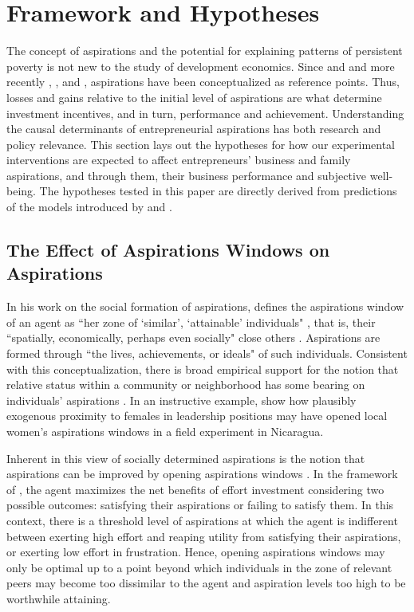 \documentclass[11.5pt]{article}
\begin{document}
\section{Framework and Hypotheses} \label{sec:theory}

The concept of aspirations and the potential for explaining patterns of persistent poverty is not new to the study of development economics. Since \citet{Simon1955} and \citet{Selten1998} and more recently \citet{Bogliacino2014}, \citet{Dalton2016}, and \citet{Genicot2017}, aspirations have been conceptualized as reference points. Thus, losses and gains relative to the initial level of aspirations are what determine investment incentives, and in turn, performance and achievement. Understanding the causal determinants of entrepreneurial aspirations has both research and policy relevance. This section lays out the hypotheses for how our experimental interventions are expected to affect entrepreneurs' business and family aspirations, and through them, their business performance and subjective well-being. The hypotheses tested in this paper are directly derived from predictions of the models introduced by \citet{Dalton2016} and \citet{Genicot2017}.

\subsection{The Effect of Aspirations Windows on Aspirations}

In his work on the social formation of aspirations, \citet{Ray2003, Ray2006} defines the aspirations window of an agent as ``her zone of  `similar', `attainable' individuals" \citep[][p.1]{Ray2003}, that is, their ``spatially, economically, perhaps even socially" close others \citep[][p.2]{Ray2003}. Aspirations are formed through ``the lives, achievements, or ideals" \citep[][p.2]{Ray2003} of such individuals. Consistent with this conceptualization, there is broad empirical support for the notion that relative status within a community or neighborhood has some bearing on individuals' aspirations \citep[][]{Bernard2014, Beaman2012, Janzen2017, Knight2012, Stutzer2004}. In an instructive example, \citet{Macours2014} show how plausibly exogenous proximity to females in leadership positions may have opened local women's aspirations windows in a field experiment in Nicaragua.

Inherent in this view of socially determined aspirations is the notion that aspirations can be improved by opening aspirations windows \citep[see,][]{Ray2006, Genicot2017, Janzen2017}. In the framework of \citet{Genicot2017}, the agent maximizes the net benefits of effort investment considering two possible outcomes: satisfying their aspirations or failing to satisfy them. In this context, there is a threshold level of aspirations at which the agent is indifferent between exerting high effort and reaping utility from satisfying their aspirations, or exerting low effort in frustration. Hence, opening aspirations windows may only be optimal up to a point beyond which individuals in the zone of relevant peers may become too dissimilar to the agent and aspiration levels too high to be worthwhile attaining.
\end{document}
